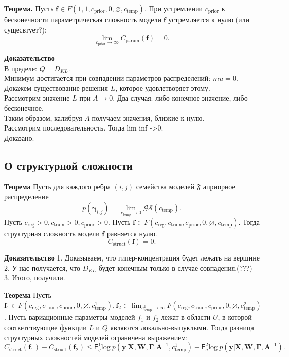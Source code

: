 \textbf{Теорема.}
Пусть $\mathbf{f} \in F(1, 1, c_{\text{prior}}, 0, \varnothing,  c_{\text{temp}} )$.
При устремлении $ c_{\text{prior}}$ к бесконечности параметрическая сложность модели $\mathbf{f}$ устремляется к нулю (или сущесвтует?):
\[
    \lim_{c_{\text{prior}} \to \infty} C_{\text{param}}(\mathbf{f}) = 0.
\]

\textbf{Доказательство}\\
В пределе: $Q = D_{KL}.$\\
Минимум достигается при совпадении параметров распределений: $mu = 0$.\\
Докажем существование решения $L$, которое удовлетворяет этому.\\
Рассмотрим значение $L$ при $A \to 0$. Два случая: либо конечное значение, либо бесконечное.\\
Таким образом, калибруя $A$ получаем значения, близкие к нулю. \\
Рассмотрим последовательность. Тогда lim inf ->0.\\
Доказано. 








\subsection{О структурной сложности}
\textbf{Теорема}
Пусть для каждого ребра $(i,j)$ семейства моделей $\mathfrak{F}$ априорное распределение $$p(\boldsymbol{\gamma}_{i,j}) =  \lim_{c_{\text{temp}} \to 0} \mathcal{GS}(c_{\text{temp}}).$$
Пусть $c_{\text{reg}} >0, c_{\text{train}} >0, c_{\text{prior}}>0$.
Пусть $\mathbf{f} \in F(c_{\text{reg}}, c_{\text{train}}, c_{\text{prior}}, 0, \varnothing, c_{\text{temp}})$.
Тогда структурная сложность модели $\mathbf{f}$ равняется нулю.
\[
    C_\text{struct}(\mathbf{f}) = 0.
\]
    
\textbf{Доказательство}
1. Доказываем, что гипер-концентрация будет лежать на вершине\\
2. У нас получается, что $D_{KL}$ будет конечным только в случае совпадения.(???)
3. Итого, получили.

\textbf{Теорема}
Пусть $\mathbf{f}_1 \in F(c_{\text{reg}}, c_{\text{train}},  c_{\text{prior}}, 0, \varnothing,  c^1_{\text{temp}}), \mathbf{f}_2   \in \lim_{c^2_{\text{temp}} \to \infty} F(c_{\text{reg}}, c_{\text{train}},  c_{\text{prior}}, 0, \varnothing,  c^2_{\text{temp}})$.
Пусть вариационные параметры моделей $f_1$ и $f_2$ лежат в области $U$, в которой соответствующие функции $L$ и $Q$ являются локально-выпуклыми. 
Тогда разница структурных сложностей моделей ограничена выражением:
\[
    C_\text{struct}(\mathbf{f}_1)  - C_\text{struct}(\mathbf{f}_2) \leq {\mathsf{E}_q^1 \text{log}~{p(\mathbf{y} | \mathbf{X}, \mathbf{W}, \boldsymbol{\Gamma}. \mathbf{A}^{-1}, c^1_{\text{temp}})}} - {\mathsf{E}_q^2 \text{log}~{p(\mathbf{y} | \mathbf{X}, \mathbf{W}, \boldsymbol{\Gamma}, \mathbf{A}^{-1})}}.
\]

